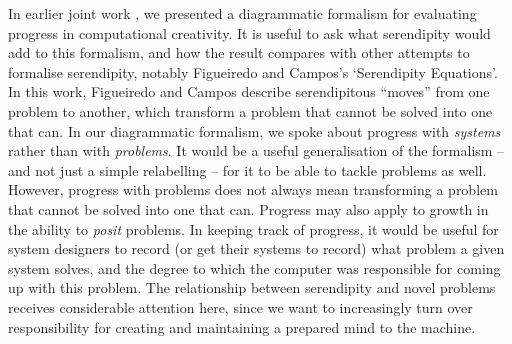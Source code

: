 In earlier joint work \cite{colton-assessingprogress}, we presented a
diagrammatic formalism for evaluating progress in computational
creativity.  It is useful to ask what serendipity would add to this
formalism, and how the result compares with other attempts to
formalise serendipity, notably Figueiredo and Campos's
\citeyear{Figueiredo2001} `Serendipity Equations'.  In this work,
Figueiredo and Campos describe serendipitous ``moves'' from one
problem to another, which transform a problem that cannot be solved
into one that can.  In our diagrammatic formalism, we spoke about
progress with \emph{systems} rather than with \emph{problems}.  It
would be a useful generalisation of the formalism -- and not just a
simple relabelling -- for it to be able to tackle problems as well.
However, progress with problems does not always mean transforming a
problem that cannot be solved into one that can.  Progress may also
apply to growth in the ability to \emph{posit} problems.  In keeping
track of progress, it would be useful for system designers to record
(or get their systems to record) what problem a given system solves,
and the degree to which the computer was responsible for coming up
with this problem.  The relationship between serendipity and novel
problems receives considerable attention here, since we want to
increasingly turn over responsibility for creating and maintaining a
prepared mind to the machine.
